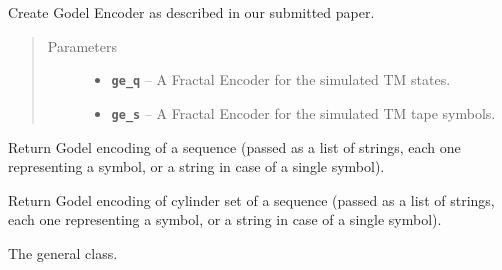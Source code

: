 \documentclass[letterpaper,10pt,english]{sphinxmanual}
\begin{document}
\begin{fulllineitems}
\label{symdyn_docs:symdyn.compactGodelEncoder}
Create Godel Encoder as described in our submitted paper.
\begin{quote}\begin{description}
\item[{Parameters}] \leavevmode\begin{itemize}
\item {} 
\textbf{\texttt{ge\_q}} -- A Fractal Encoder for the simulated TM states.

\item {} 
\textbf{\texttt{ge\_s}} -- A Fractal Encoder for the simulated TM tape symbols.

\end{itemize}

\end{description}\end{quote}

\begin{fulllineitems}
\label{symdyn_docs:symdyn.compactGodelEncoder.encode_sequence}
Return Godel encoding of a sequence (passed as a list of strings,
each one representing a symbol, or a string in case of a single
symbol).

\end{fulllineitems}


\begin{fulllineitems}
\label{symdyn_docs:symdyn.compactGodelEncoder.encode_cylinder}
Return Godel encoding of cylinder set of a sequence (passed as a
list of strings, each one representing a symbol, or a string
in case of a single symbol).

\end{fulllineitems}


\end{fulllineitems}


\begin{fulllineitems}
\label{symdyn_docs:symdyn.AbstractGeneralizedShift}
The general class.

\end{fulllineitems}
\end{document}
